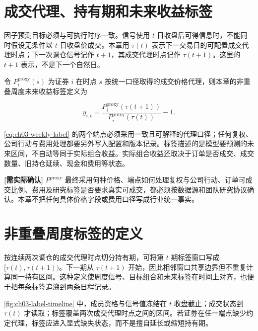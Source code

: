 \section{成交代理、持有期和未来收益标签}

因子预测目标必须与可执行时序一致。信号使用 \(t\) 日收盘后可得信息时，不能同时假设无条件以 \(t\) 日收盘价成交。本章用 \(\tau(t)\) 表示下一交易日的可配置成交代理时点；下一次调仓信号记作 \(t+1\)，其成交代理时点记作 \(\tau(t+1)\)。这里的 \(t+1\) 表示，不是下一个自然日。

令 \(P_i^{\mathrm{proxy}}(s)\) 为证券 \(i\) 在时点 \(s\) 按统一口径取得的成交价格代理，则本章的非重叠周度未来收益标签定义为

\begin{equation}
  y_{i,t}
  = \frac{P_i^{\mathrm{proxy}}\!\left(\tau(t+1)\right)}
  {P_i^{\mathrm{proxy}}\!\left(\tau(t)\right)} - 1 .
  \label{eq:ch03-weekly-label}
\end{equation}

\cref{eq:ch03-weekly-label} 的两个端点必须采用一致且可解释的代理口径；任何复权、公司行动与费用处理都要另外写入配置和版本记录。标签描述的是模型要预测的未来区间，不自动等同于实际组合收益。实际组合收益还取决于订单是否成交、成交数量、旧持仓延续、现金和费用等状态。

\begin{confirmbox}
\textbf{[需实际确认]} \(P^{\mathrm{proxy}}\) 最终采用何种价格、端点如何处理复权与公司行动、订单可成交比例、费用及研究标签是否要求真实可成交，都必须按数据源和团队研究协议确认。本章不把任何具体价格字段或费用口径写成行业统一事实。
\end{confirmbox}

\section{非重叠周度标签的定义}

按连续两次调仓的成交代理时点切分持有期，可将第 \(t\) 期标签窗口写成 \([\tau(t),\tau(t+1))\)。下一期从 \(\tau(t+1)\) 开始，因此相邻窗口共享边界但不重复计算同一持有区间。这种定义使周度信号、目标组合和未来标签在时间上对齐，也便于把每条标签追溯到两条日程记录。

\cref{fig:ch03-label-timeline} 中，成员资格与信号值冻结在 \(t\) 收盘截止；成交状态到 \(\tau(t)\) 才读取；标签覆盖两次成交代理时点之间的区间。若证券在任一端点缺少约定代理，标签应进入显式缺失状态，而不是擅自延长或缩短持有期。


